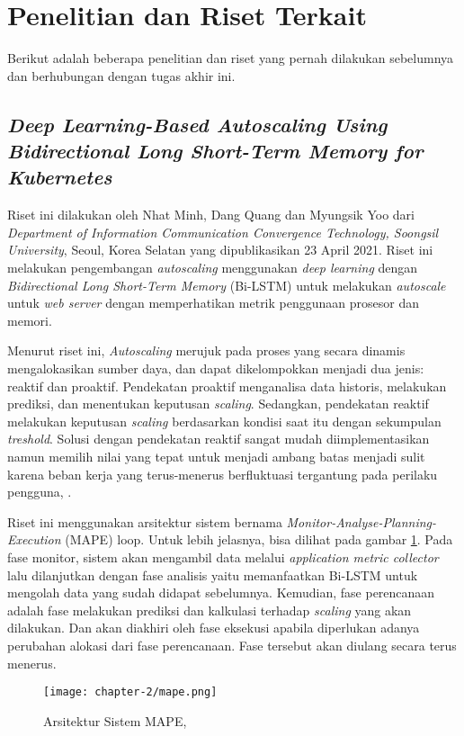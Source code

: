 \section{Penelitian dan Riset Terkait}
Berikut adalah beberapa penelitian dan riset yang pernah dilakukan sebelumnya dan berhubungan dengan tugas akhir ini.

\subsection{\textit{Deep Learning-Based Autoscaling Using Bidirectional Long Short-Term Memory for Kubernetes}}
Riset ini dilakukan oleh Nhat Minh, Dang Quang dan Myungsik Yoo dari \textit{Department of Information Communication Convergence Technology, Soongsil University}, Seoul, Korea Selatan yang dipublikasikan 23 April 2021. Riset ini melakukan pengembangan \textit{autoscaling} menggunakan \textit{deep learning} dengan \textit{Bidirectional Long Short-Term Memory} (Bi-LSTM) untuk melakukan \textit{autoscale} untuk \textit{web server} dengan memperhatikan metrik penggunaan prosesor dan memori.

Menurut riset ini, \textit{Autoscaling} merujuk pada proses yang secara dinamis mengalokasikan sumber daya, dan dapat dikelompokkan menjadi dua jenis: reaktif dan proaktif. Pendekatan proaktif menganalisa data historis, melakukan prediksi, dan menentukan keputusan \textit{scaling}. Sedangkan, pendekatan reaktif melakukan keputusan \textit{scaling} berdasarkan kondisi saat itu dengan sekumpulan \textit{treshold}. Solusi dengan pendekatan reaktif sangat mudah diimplementasikan namun memilih nilai yang tepat untuk menjadi ambang batas menjadi sulit karena beban kerja yang terus-menerus berfluktuasi tergantung pada perilaku pengguna, \parencite{riset1}.

Riset ini menggunakan arsitektur sistem bernama \textit{Monitor-Analyse-Planning-Execution} (MAPE) loop. Untuk lebih jelasnya, bisa dilihat pada gambar \ref{fig:mape}. Pada fase monitor, sistem akan mengambil data melalui \textit{application metric collector} lalu dilanjutkan dengan fase analisis yaitu memanfaatkan Bi-LSTM untuk mengolah data yang sudah didapat sebelumnya. Kemudian, fase perencanaan adalah fase melakukan prediksi dan kalkulasi terhadap \textit{scaling} yang akan dilakukan. Dan akan diakhiri oleh fase eksekusi apabila diperlukan adanya perubahan alokasi dari fase perencanaan. Fase tersebut akan diulang secara terus menerus.

\begin{figure}[h]
    \centering
    \texttt{[image: chapter-2/mape.png]}
    \caption{Arsitektur Sistem MAPE, \parencite{riset1}}
    \label{fig:mape}
\end{figure}

